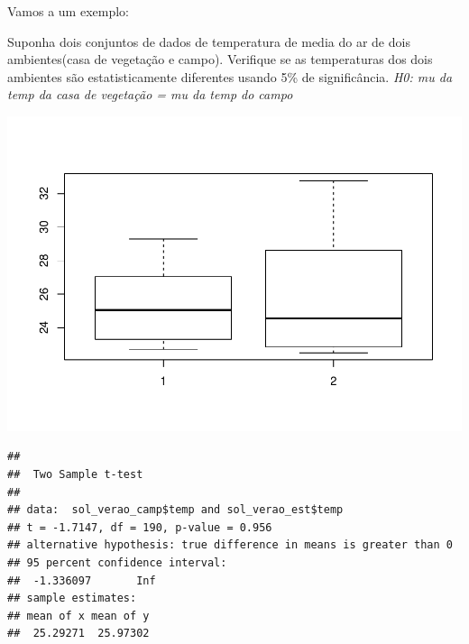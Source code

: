 \documentclass[
]{book}
\newenvironment{Shaded}{\begin{snugshade}}{\end{snugshade}}
\newcommand{\CommentTok}[1]{\textcolor[rgb]{0.56,0.35,0.01}{\textit{#1}}}
\newcommand{\DataTypeTok}[1]{\textcolor[rgb]{0.13,0.29,0.53}{#1}}
\newcommand{\KeywordTok}[1]{\textcolor[rgb]{0.13,0.29,0.53}{\textbf{#1}}}
\newcommand{\NormalTok}[1]{#1}
\newcommand{\OperatorTok}[1]{\textcolor[rgb]{0.81,0.36,0.00}{\textbf{#1}}}
\newcommand{\StringTok}[1]{\textcolor[rgb]{0.31,0.60,0.02}{#1}}
\begin{document}
Vamos a um exemplo:

Suponha dois conjuntos de dados de temperatura de media do ar de dois ambientes(casa de vegetação e campo). Verifique se as temperaturas dos dois ambientes são estatisticamente diferentes usando 5\% de significância.
\emph{H0: mu da temp da casa de vegetação = mu da temp do campo}

\begin{Shaded}
\end{Shaded}

\includegraphics{TudodoR_files/figure-latex/unnamed-chunk-255-1.pdf}

\begin{Shaded}
\end{Shaded}

\begin{verbatim}
## 
##  Two Sample t-test
## 
## data:  sol_verao_camp$temp and sol_verao_est$temp
## t = -1.7147, df = 190, p-value = 0.956
## alternative hypothesis: true difference in means is greater than 0
## 95 percent confidence interval:
##  -1.336097       Inf
## sample estimates:
## mean of x mean of y 
##  25.29271  25.97302
\end{verbatim}
\end{document}
